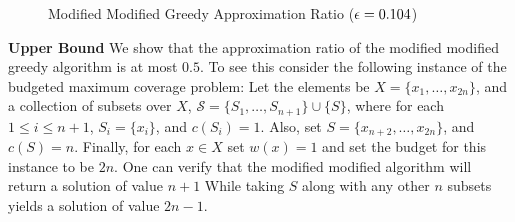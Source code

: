 \begin{figure}
\caption{
\label{fig:mmgreedy}
Modified Modified Greedy Approximation Ratio ($\epsilon = 0.104$)
}
\end{figure}

\textbf{Upper Bound}
We show that the approximation ratio of the modified modified greedy algorithm is at most $0.5$.
To see this consider the following instance of the budgeted maximum coverage problem:
Let the elements be $X = \{x_1, \dots, x_{2n}\}$, 
and a collection of subsets over $X$, $\mathcal{S} = \{S_1, \dots, S_{n + 1}\} \cup \{S\}$,
where for each $1 \leq i \leq n + 1$, $S_i = \{x_i\}$, and $c(S_i) = 1$. 
Also, set $S = \{x_{n + 2}, \dots, x_{2n}\}$, and $c(S) = n$.
Finally, for each $x \in X$ set $w(x) = 1$ and set the budget for this instance to be $2n$.
One can verify that the modified modified algorithm will return a solution of value $n + 1$
While taking $S$ along with any other $n$ subsets yields a solution of value $2n - 1$.  




